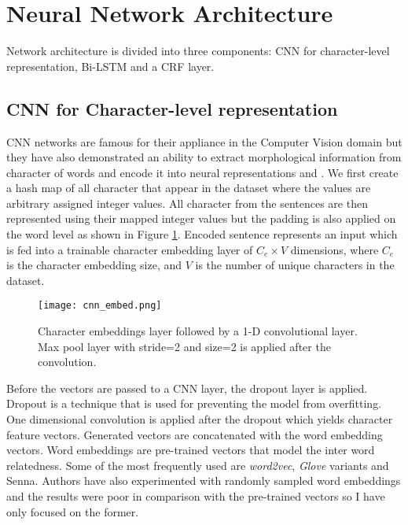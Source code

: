 \section{Neural Network Architecture}
Network architecture is divided into three components: CNN for character-level
representation, Bi-LSTM and a CRF layer.

\subsection{CNN for Character-level representation}
CNN networks are famous for their appliance in the Computer Vision domain but
they have also demonstrated an ability to extract morphological information
from character of words and encode it into neural
representations\cite{santos2014learning} and \cite{chiu2015named}.
We first create a hash map of all character
that appear in the dataset where the values are arbitrary assigned integer
values. All character from the sentences are then represented using their 
mapped integer values but the padding is also applied on the word level as
shown in Figure \ref{fig:cnn_embed}.
Encoded sentence represents an input which is fed into a trainable character embedding
layer of $C_e \times V$ dimensions, where $C_e$ is the character embedding size,
and $V$ is the number of unique characters in the dataset.

\begin{figure}
  \caption{Character embeddings layer followed by a 1-D convolutional layer.
  Max pool layer with stride=2 and size=2 is applied after the convolution.}
  \label{fig:cnn_embed}
  \centering
    \texttt{[image: cnn\_embed.png]}
\end{figure}

Before the vectors are passed to a CNN layer, the
dropout\cite{srivastava2014dropout} layer is
applied. Dropout is a technique that is used for preventing the model from
overfitting. One dimensional convolution is applied after the dropout which
yields character feature vectors. Generated vectors are concatenated with the word
embedding vectors. Word embeddings are pre-trained vectors
that model the inter word relatedness. Some of the most frequently used are
\textit{word2vec}\cite{mikolov2013distributed}, \textit{Glove}
variants\cite{pennington2014glove} and
Senna\cite{collobert2011natural}. Authors have also experimented with randomly sampled word
embeddings and the results were poor in comparison with the pre-trained vectors
so I have only focused on the former.

